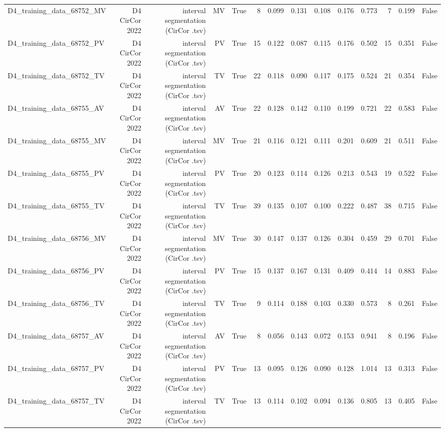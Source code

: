 \begin{table}[htbp]
\begin{tabular}{lrrrrrrrrrrrrr}
    D4\_training\_data\_68752\_MV & D4 CirCor 2022 & interval segmentation (CirCor .tsv) & MV & True & 8 & 0.099 & 0.131 & 0.108 & 0.176 & 0.773 & 7 & 0.199 & False \\
    D4\_training\_data\_68752\_PV & D4 CirCor 2022 & interval segmentation (CirCor .tsv) & PV & True & 15 & 0.122 & 0.087 & 0.115 & 0.176 & 0.502 & 15 & 0.351 & False \\
    D4\_training\_data\_68752\_TV & D4 CirCor 2022 & interval segmentation (CirCor .tsv) & TV & True & 22 & 0.118 & 0.090 & 0.117 & 0.175 & 0.524 & 21 & 0.354 & False \\
    D4\_training\_data\_68755\_AV & D4 CirCor 2022 & interval segmentation (CirCor .tsv) & AV & True & 22 & 0.128 & 0.142 & 0.110 & 0.199 & 0.721 & 22 & 0.583 & False \\
    D4\_training\_data\_68755\_MV & D4 CirCor 2022 & interval segmentation (CirCor .tsv) & MV & True & 21 & 0.116 & 0.121 & 0.111 & 0.201 & 0.609 & 21 & 0.511 & False \\
    D4\_training\_data\_68755\_PV & D4 CirCor 2022 & interval segmentation (CirCor .tsv) & PV & True & 20 & 0.123 & 0.114 & 0.126 & 0.213 & 0.543 & 19 & 0.522 & False \\
    D4\_training\_data\_68755\_TV & D4 CirCor 2022 & interval segmentation (CirCor .tsv) & TV & True & 39 & 0.135 & 0.107 & 0.100 & 0.222 & 0.487 & 38 & 0.715 & False \\
    D4\_training\_data\_68756\_MV & D4 CirCor 2022 & interval segmentation (CirCor .tsv) & MV & True & 30 & 0.147 & 0.137 & 0.126 & 0.304 & 0.459 & 29 & 0.701 & False \\
    D4\_training\_data\_68756\_PV & D4 CirCor 2022 & interval segmentation (CirCor .tsv) & PV & True & 15 & 0.137 & 0.167 & 0.131 & 0.409 & 0.414 & 14 & 0.883 & False \\
    D4\_training\_data\_68756\_TV & D4 CirCor 2022 & interval segmentation (CirCor .tsv) & TV & True & 9 & 0.114 & 0.188 & 0.103 & 0.330 & 0.573 & 8 & 0.261 & False \\
    D4\_training\_data\_68757\_AV & D4 CirCor 2022 & interval segmentation (CirCor .tsv) & AV & True & 8 & 0.056 & 0.143 & 0.072 & 0.153 & 0.941 & 8 & 0.196 & False \\
    D4\_training\_data\_68757\_PV & D4 CirCor 2022 & interval segmentation (CirCor .tsv) & PV & True & 13 & 0.095 & 0.126 & 0.090 & 0.128 & 1.014 & 13 & 0.313 & False \\
    D4\_training\_data\_68757\_TV & D4 CirCor 2022 & interval segmentation (CirCor .tsv) & TV & True & 13 & 0.114 & 0.102 & 0.094 & 0.136 & 0.805 & 13 & 0.405 & False \\

\end{tabular}
\end{table}
